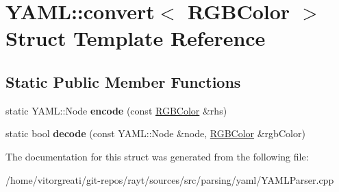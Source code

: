 \hypertarget{struct_y_a_m_l_1_1convert_3_01_r_g_b_color_01_4}{}\section{Y\+A\+ML\+::convert$<$ R\+G\+B\+Color $>$ Struct Template Reference}
\label{struct_y_a_m_l_1_1convert_3_01_r_g_b_color_01_4}
\subsection*{Static Public Member Functions}
\begin{DoxyCompactItemize}
\item 
\mbox{\label{struct_y_a_m_l_1_1convert_3_01_r_g_b_color_01_4_a53435107a4d117741eb69f1e4b837f1d}} 
static Y\+A\+M\+L\+::\+Node {\bfseries encode} (const \mbox{\hyperlink{classtao_1_1_col}{R\+G\+B\+Color}} \&rhs)
\item 
\mbox{\label{struct_y_a_m_l_1_1convert_3_01_r_g_b_color_01_4_a8696a3dc0862f142d82656eff201284a}} 
static bool {\bfseries decode} (const Y\+A\+M\+L\+::\+Node \&node, \mbox{\hyperlink{classtao_1_1_col}{R\+G\+B\+Color}} \&rgb\+Color)
\end{DoxyCompactItemize}


The documentation for this struct was generated from the following file\+:\begin{DoxyCompactItemize}
\item 
/home/vitorgreati/git-\/repos/rayt/sources/src/parsing/yaml/Y\+A\+M\+L\+Parser.\+cpp\end{DoxyCompactItemize}
